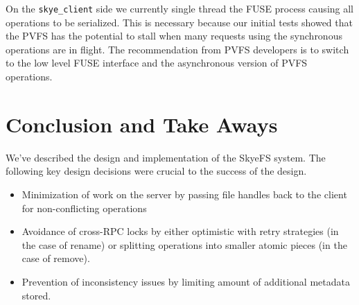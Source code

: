 \documentclass[letterpaper]{article}
\newcommand{\code}[1]{\texttt{#1}}
\begin{document}
On the \code{skye\_\-client} side we currently single thread the FUSE process causing all
operations to be serialized.  This is necessary because our initial tests
showed that the PVFS has the potential to stall when many requests using the
synchronous operations are in flight.  The recommendation from PVFS developers is
to switch to the low level FUSE interface and the asynchronous version of PVFS
operations.


\section{Conclusion and Take Aways}
We've described the design and implementation of the SkyeFS system.  The
following key design decisions were crucial to the success of the design.

\begin{itemize}
\item Minimization of work on the server by passing file handles back to the client
for non-conflicting operations
\item Avoidance of cross-RPC locks by either optimistic with retry strategies (in
the case of rename) or splitting operations into smaller atomic pieces (in the
case of remove).
\item Prevention of inconsistency issues by limiting amount of additional metadata
stored.
\end{itemize}
\end{document}
